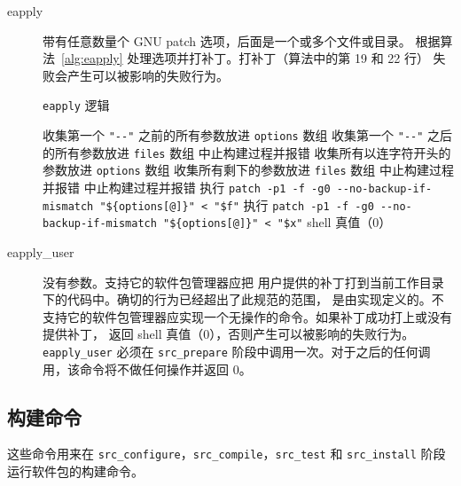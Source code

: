 \begin{description}
\item[eapply] 带有任意数量个 GNU patch 选项，后面是一个或多个文件或目录。
    根据算法~\ref{alg:eapply} 处理选项并打补丁。打补丁（算法中的第 19 和 22 行）
    失败会产生可以被影响的失败行为。

\begin{algorithm}[t]
\caption{\texttt{eapply} 逻辑} \label{alg:eapply}
\begin{algorithmic}[1]
    \STATE 收集第一个 \texttt{"-{}-"} 之前的所有参数放进 \texttt{options} 数组
    \STATE 收集第一个 \texttt{"-{}-"} 之后的所有参数放进 \texttt{files} 数组
    \STATE 中止构建过程并报错
\ELSE
    \STATE 收集所有以连字符开头的参数放进 \texttt{options} 数组
    \STATE 收集所有剩下的参数放进 \texttt{files} 数组
\ENDIF
{}
    \STATE 中止构建过程并报错
\ENDIF
{}
            \STATE 中止构建过程并报错
        \ENDIF
            \STATE 执行 \texttt{patch -p1 -f -g0 -{}-no-backup-if-mismatch "\$\{options[@]\}" < "\$f"}
        \ENDFOR
    \ELSE
        \STATE 执行 \texttt{patch -p1 -f -g0 -{}-no-backup-if-mismatch "\$\{options[@]\}" < "\$x"}
    \ENDIF
\ENDFOR
\RETURN shell 真值（0）
\end{algorithmic}
\end{algorithm}

\item[eapply_user] 没有参数。支持它的软件包管理器应把
    用户提供的补丁打到当前工作目录下的代码中。确切的行为已经超出了此规范的范围，
    是由实现定义的。不支持它的软件包管理器应实现一个无操作的命令。如果补丁成功打上或没有提供补丁，
    返回 shell 真值（0），否则产生可以被影响的失败行为。\texttt{eapply_user} 必须在
    \texttt{src_prepare} 阶段中调用一次。对于之后的任何调用，该命令将不做任何操作并返回 0。
\end{description}

\subsection{构建命令}
这些命令用来在 \texttt{src_configure}，\texttt{src_compile}，\texttt{src_test}
和 \texttt{src_install} 阶段运行软件包的构建命令。

